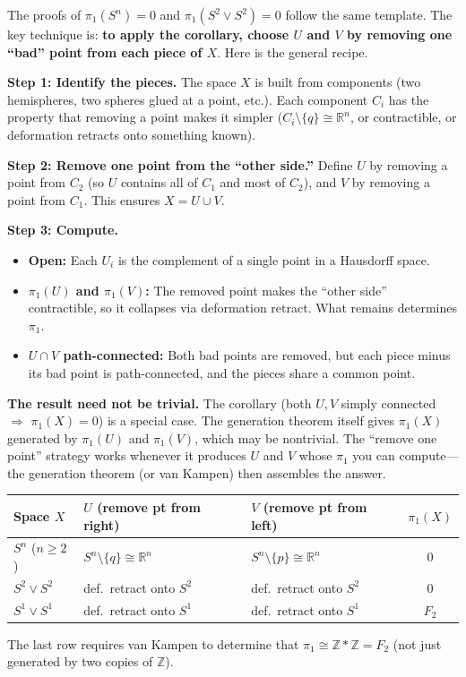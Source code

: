 \documentclass[11pt]{report}
\begin{document}
\begin{rembox}
The proofs of $\pi_1(S^n) = 0$ and $\pi_1(S^2 \vee S^2) = 0$ follow the same template. The key technique is: \textbf{to apply the corollary, choose $U$ and $V$ by removing one ``bad'' point from each piece of $X$}. Here is the general recipe.

\textbf{Step 1: Identify the pieces.} The space $X$ is built from components (two hemispheres, two spheres glued at a point, etc.). Each component $C_i$ has the property that removing a point makes it simpler ($C_i \setminus \{q\} \cong \mathbb{R}^n$, or contractible, or deformation retracts onto something known).

\textbf{Step 2: Remove one point from the ``other side.''} Define $U$ by removing a point from $C_2$ (so $U$ contains all of $C_1$ and most of $C_2$), and $V$ by removing a point from $C_1$. This ensures $X = U \cup V$.

\textbf{Step 3: Compute.}
\begin{itemize}[nosep]
    \item \textbf{Open:} Each $U_i$ is the complement of a single point in a Hausdorff space.
    \item \textbf{$\pi_1(U)$ and $\pi_1(V)$:} The removed point makes the ``other side'' contractible, so it collapses via deformation retract. What remains determines $\pi_1$.
    \item \textbf{$U \cap V$ path-connected:} Both bad points are removed, but each piece minus its bad point is path-connected, and the pieces share a common point.
\end{itemize}

\textbf{The result need not be trivial.} The corollary (both $U, V$ simply connected $\Rightarrow$ $\pi_1(X) = 0$) is a special case. The generation theorem itself gives $\pi_1(X)$ generated by $\pi_1(U)$ and $\pi_1(V)$, which may be nontrivial. The ``remove one point'' strategy works whenever it produces $U$ and $V$ whose $\pi_1$ you can compute---the generation theorem (or van Kampen) then assembles the answer.

\begin{center}
\small
\begin{tabular}{|p{2.2cm}|p{3.5cm}|p{3.5cm}|c|}
\hline
\textbf{Space $X$} & \textbf{$U$} (remove pt from right) & \textbf{$V$} (remove pt from left) & $\pi_1(X)$ \\
\hline
$S^n$ ($n \geq 2$) & $S^n \setminus \{q\} \cong \mathbb{R}^n$ & $S^n \setminus \{p\} \cong \mathbb{R}^n$ & $0$ \\
\hline
$S^2 \vee S^2$ & def.\ retract onto $S^2$ & def.\ retract onto $S^2$ & $0$ \\
\hline
$S^1 \vee S^1$ & def.\ retract onto $S^1$ & def.\ retract onto $S^1$ & $F_2$ \\
\hline
\end{tabular}
\end{center}
The last row requires van Kampen to determine that $\pi_1 \cong \mathbb{Z} * \mathbb{Z} = F_2$ (not just generated by two copies of $\mathbb{Z}$).
\end{rembox}
\end{document}
